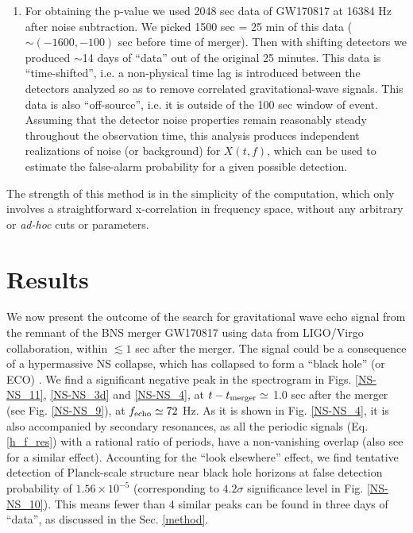 \documentclass[12pt]{article}
\begin{document}
\begin{enumerate}
\item For obtaining the p-value we used 2048 sec data of GW170817 at 16384 Hz after noise subtraction. We picked 1500 sec = 25 min of this data ($\sim (-1600,-100)$ sec before time of merger). Then with shifting detectors we produced $\sim$14 days of ``data'' out of the original 25 minutes. This data is ``time-shifted'', i.e. a non-physical time lag is introduced between the detectors analyzed so as to remove correlated gravitational-wave signals. This data is also ``off-source'', i.e. it is outside of the 100 sec window of event. Assuming that the detector noise properties remain reasonably steady throughout the observation time, this analysis produces independent realizations of noise (or background) for $X(t,f)$, which can be used to estimate the false-alarm probability for a given possible detection.

\end{enumerate}


The strength of this method is in the simplicity of the computation, which only involves a straightforward x-correlation in frequency space,  without any arbitrary or {\it ad-hoc} cuts or parameters.


\section{\label{Results}Results}

We now present the outcome of the search for gravitational wave echo signal from the remnant of the BNS merger GW170817 using data from LIGO/Virgo collaboration, within  $\lesssim 1$ sec after the merger. The signal could be a consequence of a hypermassive NS collapse, which has collapsed to form a ``black hole'' (or ECO) \cite{Abbott:2017dke}.
We find a significant negative peak in the spectrogram in Figs. \ref{NS-NS_11}, \ref{NS-NS_3d} and \ref{NS-NS_4}, at $t-t_{\rm{merger}} \simeq $ 1.0 sec after the merger (see Fig. \ref{NS-NS_9}), at $f_{\rm echo} \simeq 72$ Hz. As it is shown in Fig. \ref{NS-NS_4}, it is also accompanied by secondary resonances, as all the periodic signals (Eq. \ref{h_f_res}) with a rational ratio of periods, have a non-vanishing overlap (also see \cite{Conklin:2017lwb} for a similar effect). Accounting for the ``look elsewhere'' effect, we find tentative detection of Planck-scale structure near black hole horizons at false detection probability of $1.56\times 10^{-5}$ (corresponding to $4.2\sigma$ significance level in Fig. \ref{NS-NS_10}). This means fewer than 4 similar peaks can be found in three days of ``data'', as discussed in the Sec. \ref{method}. 
\end{document}
